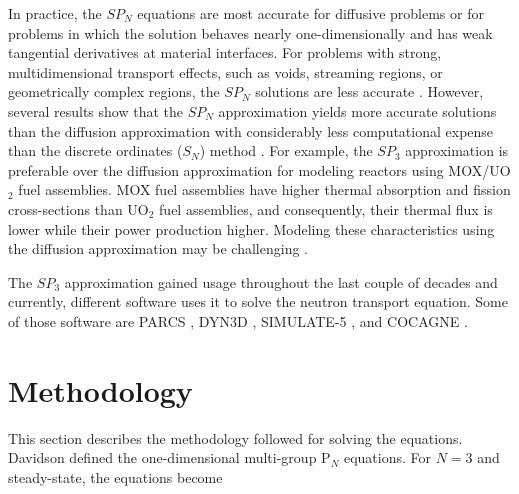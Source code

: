 \documentclass{anstrans}
\begin{document}
In practice, the $SP_N$ equations are most accurate for diffusive problems or for problems in which the solution behaves nearly one-dimensionally and has weak tangential derivatives at material interfaces.
For problems with strong, multidimensional transport effects, such as voids, streaming regions, or geometrically complex regions, the $SP_N$ solutions are less accurate \cite{downar_parcs_2004}.
However, several results show that the $SP_N$ approximation yields more accurate solutions than the diffusion approximation \cite{mui_modified_1987} \cite{beckert_development_2007} \cite{fliscounakis_potential_2012} \cite{ryu_finite_2013} \cite{khosravi_mirzaee_reactor_2019} with considerably less computational expense than the discrete ordinates ($S_N$) method \cite{brantley_simplifiedP3_2000}.
For example, the $SP_3$ approximation is preferable over the diffusion approximation for modeling reactors using MOX/UO$_2$ fuel assemblies.
MOX fuel assemblies have higher thermal absorption and fission cross-sections than UO$_2$ fuel assemblies, and consequently, their thermal flux is lower while their power production higher.
Modeling these characteristics using the diffusion approximation may be challenging \cite{brantley_simplifiedP3_2000} \cite{capilla_applications_2009}.

The $SP_3$ approximation gained usage throughout the last couple of decades and currently, different software uses it to solve the neutron transport equation.
Some of those software are PARCS \cite{downar_parcs_2004}, DYN3D \cite{beckert_development_2007}, SIMULATE-5 \cite{bahadir_studsviks_2009}, and COCAGNE \cite{fliscounakis_potential_2012}.

\section{Methodology}

This section describes the methodology followed for solving the equations.
Davidson \cite{davidson_neutron_1957} defined the one-dimensional multi-group P$_N$ equations.
For $N=3$ and steady-state, the equations become
\end{document}
